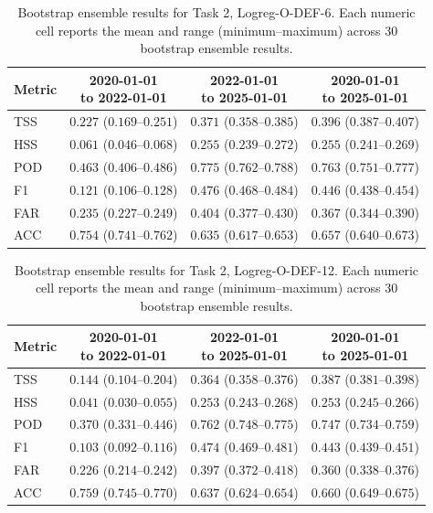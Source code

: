 \begin{table}[htbp]
\centering
\small
\caption{Bootstrap ensemble results for Task 2, Logreg-O-DEF-6. Each numeric cell reports the mean and range (minimum--maximum) across 30 bootstrap ensemble results.}
\label{tab:app-task2-logreg-o-def-6}
\begin{tabular}{lccc}
\toprule
Metric & \shortstack{2020-01-01\\to 2022-01-01} & \shortstack{2022-01-01\\to 2025-01-01} & \shortstack{2020-01-01\\to 2025-01-01} \\
\midrule
TSS & $0.227$ ($0.169$--$0.251$) & $0.371$ ($0.358$--$0.385$) & $0.396$ ($0.387$--$0.407$) \\
HSS & $0.061$ ($0.046$--$0.068$) & $0.255$ ($0.239$--$0.272$) & $0.255$ ($0.241$--$0.269$) \\
POD & $0.463$ ($0.406$--$0.486$) & $0.775$ ($0.762$--$0.788$) & $0.763$ ($0.751$--$0.777$) \\
F1 & $0.121$ ($0.106$--$0.128$) & $0.476$ ($0.468$--$0.484$) & $0.446$ ($0.438$--$0.454$) \\
FAR & $0.235$ ($0.227$--$0.249$) & $0.404$ ($0.377$--$0.430$) & $0.367$ ($0.344$--$0.390$) \\
ACC & $0.754$ ($0.741$--$0.762$) & $0.635$ ($0.617$--$0.653$) & $0.657$ ($0.640$--$0.673$) \\
\bottomrule
\end{tabular}
\end{table}
\clearpage

\begin{table}[htbp]
\centering
\small
\caption{Bootstrap ensemble results for Task 2, Logreg-O-DEF-12. Each numeric cell reports the mean and range (minimum--maximum) across 30 bootstrap ensemble results.}
\label{tab:app-task2-logreg-o-def-12}
\begin{tabular}{lccc}
\toprule
Metric & \shortstack{2020-01-01\\to 2022-01-01} & \shortstack{2022-01-01\\to 2025-01-01} & \shortstack{2020-01-01\\to 2025-01-01} \\
\midrule
TSS & $0.144$ ($0.104$--$0.204$) & $0.364$ ($0.358$--$0.376$) & $0.387$ ($0.381$--$0.398$) \\
HSS & $0.041$ ($0.030$--$0.055$) & $0.253$ ($0.243$--$0.268$) & $0.253$ ($0.245$--$0.266$) \\
POD & $0.370$ ($0.331$--$0.446$) & $0.762$ ($0.748$--$0.775$) & $0.747$ ($0.734$--$0.759$) \\
F1 & $0.103$ ($0.092$--$0.116$) & $0.474$ ($0.469$--$0.481$) & $0.443$ ($0.439$--$0.451$) \\
FAR & $0.226$ ($0.214$--$0.242$) & $0.397$ ($0.372$--$0.418$) & $0.360$ ($0.338$--$0.376$) \\
ACC & $0.759$ ($0.745$--$0.770$) & $0.637$ ($0.624$--$0.654$) & $0.660$ ($0.649$--$0.675$) \\
\bottomrule
\end{tabular}
\end{table}
\clearpage

